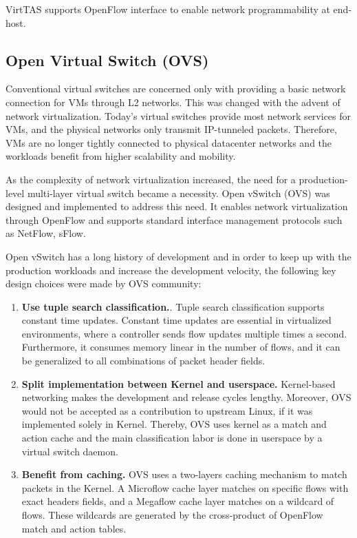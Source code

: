 VirtTAS supports OpenFlow interface to enable network programmability at end-host.

\subsection{Open Virtual Switch (OVS)}
\label{OVS}

Conventional virtual switches are concerned only with providing a basic network connection 
for VMs through L2 networks. This was changed with the advent of network virtualization. 
Today's virtual switches provide most network services for VMs, and the physical networks 
only transmit IP-tunneled packets. Therefore, VMs are no longer tightly connected to physical 
datacenter networks and the workloads benefit from higher scalability and mobility.

As the complexity of network virtualization increased, the need for a production-level 
multi-layer virtual switch became a necessity. Open vSwitch (OVS) was designed and implemented 
to address this need. It enables network virtualization through OpenFlow and supports standard 
interface management protocols such as NetFlow\cite{claise2004cisco}, sFlow\cite{wang2004sflow}.

Open vSwitch has a long history of development and in order to keep up with the production 
workloads and increase the development velocity, the following key design choices were made 
by OVS community:

\begin{enumerate}
    \item \textbf{Use tuple search classification.}.  Tuple search classification supports 
    constant time updates. Constant time updates are essential in virtualized environments,
    where a controller sends flow updates multiple times a second. Furthermore, it consumes 
    memory linear in the number of flows, and it can be generalized to all combinations of 
    packet header fields.

    \item \textbf{Split implementation between Kernel and userspace.} Kernel-based networking 
    makes the development and release cycles lengthy. Moreover, OVS would not be accepted as 
    a contribution to upstream Linux, if it was implemented solely in Kernel. Thereby, OVS 
    uses kernel as a match and action cache and the main classification labor is done in 
    userspace by a virtual switch daemon.

    \item \textbf{Benefit from caching.} OVS uses a two-layers caching mechanism to match 
    packets in the Kernel. A Microflow cache layer matches on specific flows with exact 
    headers fields, and a Megaflow cache layer matches on a wildcard of flows. These wildcards 
    are generated by the cross-product of OpenFlow match and action tables.
    
\end{enumerate}

